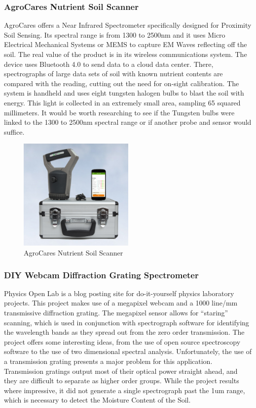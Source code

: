 \subsubsection{AgroCares Nutrient Soil Scanner}

AgroCares offers a Near Infrared Spectrometer specifically designed for Proximity Soil Sensing. Its spectral range is from 1300 to 2500nm and it uses Micro Electrical Mechanical Systems or MEMS to capture EM Waves reflecting off the soil. The real value of the product is in its wireless communications system. The device uses Bluetooth 4.0 to send data to a cloud data center. There, spectrographs of large data sets of soil with known nutrient contents are compared with the reading, cutting out the need for on-sight calibration. The system is handheld and uses eight tungsten halogen bulbs to blast the soil with energy. This light is collected in an extremely small area, sampling 65 squared millimeters. It would be worth researching to see if the Tungsten bulbs were linked to the 1300 to 2500nm spectral range or if another probe and sensor would suffice.

\begin{figure}[H]
    \caption{AgroCares Nutrient Soil Scanner}
    \centering
    \includegraphics[width=0.5\textwidth]{images/3-2-2Pic.png}
\end{figure}

\subsubsection{DIY Webcam Diffraction Grating Spectrometer}\label{sec:DIYTransmissionGratingSpectrometer}

Physics Open Lab is a blog posting site for do-it-yourself physics laboratory projects. This project makes use of a megapixel webcam and a 1000 line/mm transmissive diffraction grating. The megapixel sensor allows for “staring” scanning, which is used in conjunction with spectrograph software for identifying the wavelength bands as they spread out from the zero order transmission. The project offers some interesting ideas, from the use of open source spectroscopy software to the use of two dimensional spectral analysis. Unfortunately, the use of a transmission grating presents a major problem for this application. Transmission gratings output most of their optical power straight ahead, and they are difficult to separate as higher order groups. While the project results where impressive, it did not generate a single spectrograph past the 1um range, which is necessary to detect the Moisture Content of the Soil.

